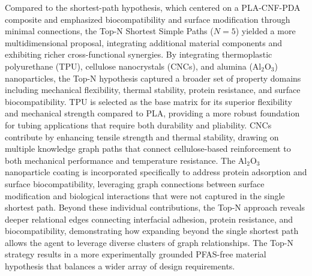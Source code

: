 Compared to the shortest-path hypothesis, which centered on a PLA-CNF-PDA composite and emphasized biocompatibility and surface modification through minimal connections, the Top-N Shortest Simple Paths ($N=5$) yielded a more multidimensional proposal, integrating additional material components and exhibiting richer cross-functional synergies. By integrating thermoplastic polyurethane (TPU), cellulose nanocrystals (CNCs), and alumina (Al$_2$O$_3$) nanoparticles, the Top-N hypothesis captured a broader set of property domains including mechanical flexibility, thermal stability, protein resistance, and surface biocompatibility. TPU is selected as the base matrix for its superior flexibility and mechanical strength compared to PLA, providing a more robust foundation for tubing applications that require both durability and pliability. CNCs contribute by enhancing tensile strength and thermal stability, drawing on multiple knowledge graph paths that connect cellulose-based reinforcement to both mechanical performance and temperature resistance. The Al$_2$O$_3$ nanoparticle coating is incorporated specifically to address protein adsorption and surface biocompatibility, leveraging graph connections between surface modification and biological interactions that were not captured in the single shortest path. Beyond these individual contributions, the Top-N approach reveals deeper relational edges connecting interfacial adhesion, protein resistance, and biocompatibility, demonstrating how expanding beyond the single shortest path allows the agent to leverage diverse clusters of graph relationships. The Top-N strategy results in a more experimentally grounded PFAS-free material hypothesis that balances a wider array of design requirements.


